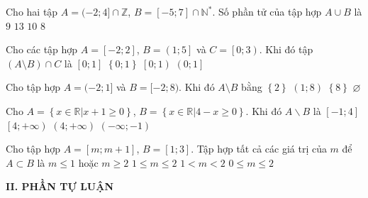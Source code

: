 \begin{ex}%
	Cho hai tập $A=(-2; 4] \cap \mathbb{Z}$, $B=[-5; 7] \cap \mathbb{N}^{*}$. Số phần tử của tập hợp $A \cup B$ là
	\choice
	{\True $9$}
	{$13$}
	{$10$}
	{$8$}
	\loigiai{
		$A=(-2; 4] \cap \mathbb{Z}=\{-1;0;1;2;3;4\}$, $B=[-5; 7] \cap \mathbb{N}^{*}=\{1;2;3;4;5;6;7\}$.\\
		Ta có $A \cup B=\{-1;0;1;2;3;4;5;6;7\}$. Vậy tập hợp $A \cup B$ có $9$ phần tử.
	}
\end{ex}
\begin{ex}%
	Cho các tập hợp $A=\left[-2;2\right]$, $B=\left(1;5\right]$ và $ C=\left[0;3\right)$. Khi đó tập $\left(A \setminus B\right)\cap C$ là
	\choice
	{\True $\left[0;1\right]$}
	{$\left\{0;1\right\}$}
	{$\left[0;1\right)$}
	{$\left(0;1\right]$}
\end{ex}
\begin{ex}%
	Cho tập hợp $A=(-2;1]$ và $B=[-2;8)$. Khi đó $A\setminus B$ bằng
	\choice
	{$\left\{ 2 \right\}$}
	{$(1;8) $}
	{$\left\{ 8 \right\}$}
	{\True $\varnothing$}
\end{ex}
\begin{ex}%
	Cho $A=\left\{x\in \mathbb{R}|x+1\ge 0\right\}$, $B=\left\{x\in \mathbb{R}|4-x\ge 0\right\}$. Khi đó $A\backslash B$ là 
	\choice
	{$\left[-1; 4\right]$}
	{$\left[4;+\infty\right)$}
	{\True $\left(4;+\infty\right)$}
	{$\left(-\infty;-1\right)$}
\end{ex}
\begin{ex}%
	Cho tập hợp $A=[m;m+1]$, $B=[1;3]$. Tập hợp tất cả các giá trị của $m$ để $A\subset B$ là
	\choice
	{$m\leq 1$ hoặc $m\geq 2$}
	{\True $1\leq m\leq 2$}
	{$1<m<2$}
	{$0\leq m\leq 2$}
\end{ex}
\noindent\textbf{II. PHẦN TỰ LUẬN}
